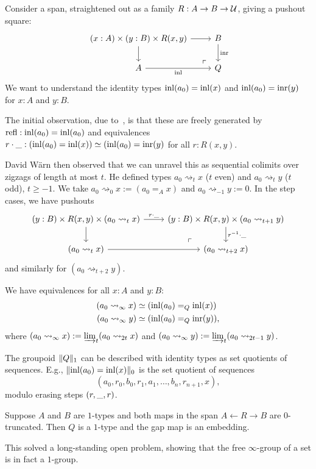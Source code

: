 \documentclass[10pt,oneside,leqno,openright]{memoir}
\newcommand*{\sto}{\rightsquigarrow}
\begin{document}
Consider a span, straightened out as a family $R : A \to B \to \mathcal{U}$, giving a pushout square:
\[
  \begin{tikzcd}
    (x:A)\times(y:B)\times R(x,y) \ar[r]\ar[d]\pocorner & B\ar[d,"{\inr}"] \\
    A \ar[r,"{\inl}"'] & Q
  \end{tikzcd}
\]
We want to understand the identity types $\operatorname{inl}(a_0) = \operatorname{inl}(x)$ and
$\operatorname{inl}(a_0) = \operatorname{inr}(y)$ for $x:A$ and $y:B$.

The initial observation, due to~\textcite{Kraus-vonRaumer}, is that these are
freely generated by $\mathrm{refl} : \operatorname{inl}(a_0) = \operatorname{inl}(a_0)$ and equivalences
$r\cdot\_ : (\operatorname{inl}(a_0) = \operatorname{inl}(x)) \simeq (\operatorname{inl}(a_0) = \operatorname{inr}(y)$ for all
$r:R(x,y)$.

David Wärn then observed that we can unravel this as sequential colimits over
zigzags of length at most $t$.
He defined types $a_0 \sto_t x$ ($t$ even) and $a_0 \sto_t y$ ($t$ odd), $t\ge-1$.
We take $a_0 \sto_0 x := (a_0 =_A x)$ and $a_0 \sto_{-1} y := 0$. In the step cases, we have pushouts
\[
  \begin{tikzcd}
    (y:B)\times R(x,y)\times(a_0\sto_t x) \ar[r,"r\cdot\blank"]\ar[d]\pocorner &
    (y:B)\times R(x,y)\times(a_0\sto_{t+1} y)\ar[d,"r^{-1}\cdot\blank"] \\
    (a_0 \sto_t x) \ar[r] & (a_0 \sto_{t+2} x)
  \end{tikzcd}
\]
and similarly for $(a_0 \sto_{t+2} y)$.
\begin{theorem}[Wärn]
  We have equivalences for all $x:A$ and $y:B$:
  \begin{align*}
    (a_0 \sto_\infty x) &\simeq (\inl(a_0) =_Q \inl(x)) \\
    (a_0 \sto_\infty y) &\simeq (\inl(a_0) =_Q \inr(y)),
  \end{align*}
  where $(a_0 \sto_\infty x) := \varinjlim_t (a_0 \sto_{2t} x)$ and
  $(a_0 \sto_\infty y) := \varinjlim_t (a_0 \sto_{2t-1} y)$.
\end{theorem}
\begin{corollary}
  The groupoid $\lVert Q\rVert_1$ can be described with identity types as set quotients of sequences.
  E.g., $\lVert\operatorname{inl}(a_0)=\operatorname{inl}(x)\rVert_0$ is the set quotient of
  sequences
  \[(a_0,r_0,b_0,r_1,a_1,\ldots,b_n,r_{n+1},x),\]
  modulo erasing steps $(r,\_,r)$.
\end{corollary}

\begin{corollary}
  Suppose $A$ and $B$ are $1$-types and both maps in the span
  $A \leftarrow R\to B$ are $0$-truncated. Then $Q$ is a $1$-type and the gap
  map is an embedding.
\end{corollary}
This solved a long-standing open problem, showing that the free $\infty$-group
of a set is in fact a $1$-group.
\end{document}
